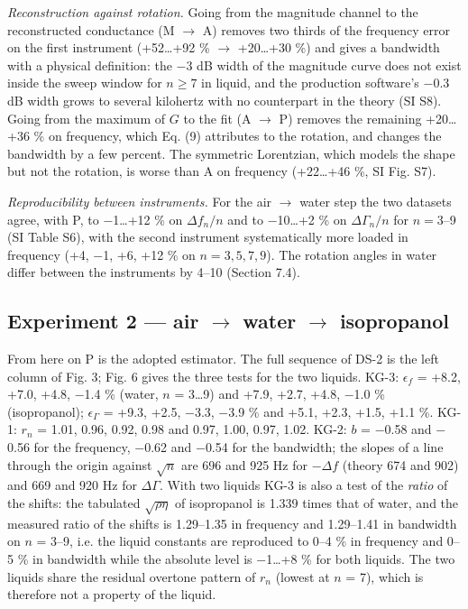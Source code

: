 \documentclass[11pt,a4paper]{article}
\begin{document}
\emph{Reconstruction against rotation.} Going from the magnitude channel to the reconstructed conductance (M $\rightarrow$ A) removes two thirds of the frequency error on the first instrument (+52\ldots{}+92 \% $\rightarrow$ +20\ldots{}+30 \%) and gives a bandwidth with a physical definition: the $-$3 dB width of the magnitude curve does not exist inside the sweep window for $n \ge 7$ in liquid, and the production software's $-$0.3 dB width grows to several kilohertz with no counterpart in the theory (SI S8). Going from the maximum of $G$ to the fit (A $\rightarrow$ P) removes the remaining +20\ldots{}+36 \% on frequency, which Eq. (9) attributes to the rotation, and changes the bandwidth by a few percent. The symmetric Lorentzian, which models the shape but not the rotation, is worse than A on frequency (+22\ldots{}+46 \%, SI Fig. S7).

\emph{Reproducibility between instruments.} For the air $\rightarrow$ water step the two datasets agree, with P, to $-$1\ldots{}+12 \% on $\Delta f_n/n$ and to $-$10\ldots{}+2 \% on $\Delta\Gamma_n/n$ for $n = 3$--9 (SI Table S6), with the second instrument systematically more loaded in frequency (+4, $-$1, +6, +12 \% on $n = 3, 5, 7, 9$). The rotation angles in water differ between the instruments by 4--10\textdegree{} (Section 7.4).

\subsection{Experiment 2 --- air $\rightarrow$ water $\rightarrow$ isopropanol}

From here on P is the adopted estimator. The full sequence of DS-2 is the left column of Fig. 3; Fig. 6 gives the three tests for the two liquids. KG-3: $\epsilon_f$ = +8.2, +7.0, +4.8, $-$1.4 \% (water, $n$ = 3\ldots{}9) and +7.9, +2.7, +4.8, $-$1.0 \% (isopropanol); $\epsilon_\Gamma$ = +9.3, +2.5, $-$3.3, $-$3.9 \% and +5.1, +2.3, +1.5, +1.1 \%. KG-1: $r_n$ = 1.01, 0.96, 0.92, 0.98 and 0.97, 1.00, 0.97, 1.02. KG-2: $b$ = $-$0.58 and $-$0.56 for the frequency, $-$0.62 and $-$0.54 for the bandwidth; the slopes of a line through the origin against $\sqrt n$ are 696 and 925 Hz for $-\Delta f$ (theory 674 and 902) and 669 and 920 Hz for $\Delta\Gamma$. With two liquids KG-3 is also a test of the \emph{ratio} of the shifts: the tabulated $\sqrt{\rho\eta}$ of isopropanol is 1.339 times that of water, and the measured ratio of the shifts is 1.29--1.35 in frequency and 1.29--1.41 in bandwidth on $n$ = 3--9, i.e. the liquid constants are reproduced to 0--4 \% in frequency and 0--5 \% in bandwidth while the absolute level is $-$1\ldots{}+8 \% for both liquids. The two liquids share the residual overtone pattern of $r_n$ (lowest at $n$ = 7), which is therefore not a property of the liquid.
\end{document}
